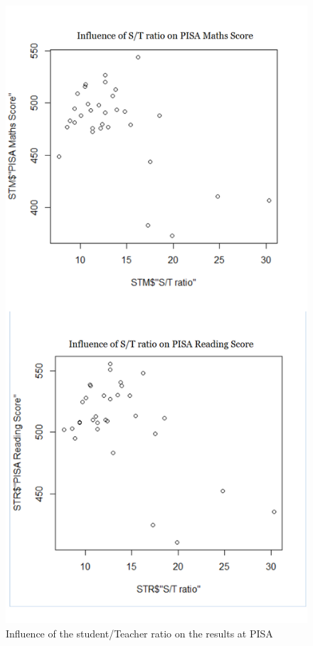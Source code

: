 \documentclass[12pt,a4paper]{article}
\begin{document}
\begin{figure}
	\centering
	\caption{Influence of the student/Teacher ratio on the results at PISA}
	\includegraphics[scale=0.4]{img/STRatio.png}
\end{figure}
\end{document}
